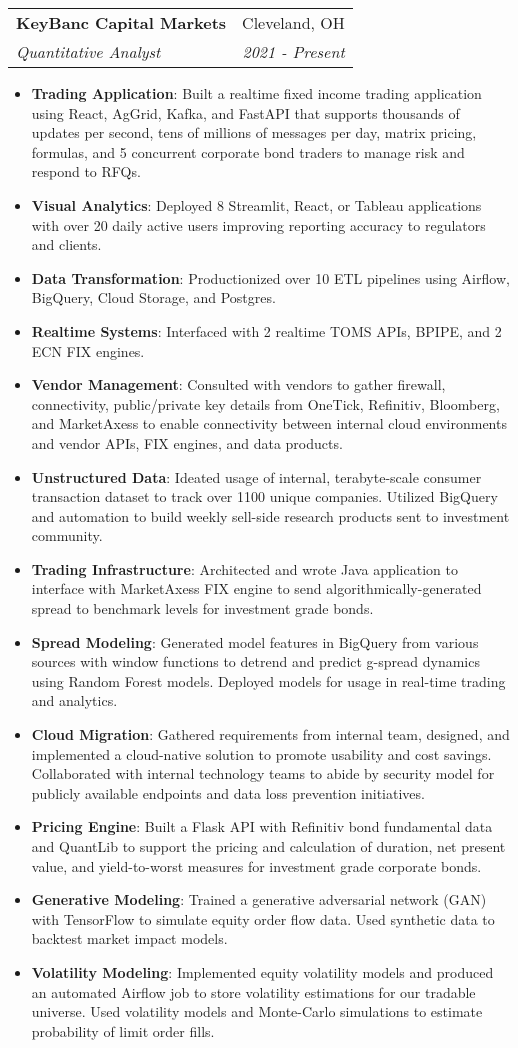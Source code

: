 \documentclass[letterpaper,11pt]{article}
\makeatletter
\newcommand{\resumeItem}[2]{
  \item\small{
    \textbf{#1}{: #2 \vspace{-2pt}}
  }
}
\newcommand{\resumeSubheading}[4]{
  \vspace{-1pt}\item
    \begin{tabular*}{0.97\textwidth}[t]{l@{\extracolsep{\fill}}r}
      \textbf{#1} & #2 \\
      \textit{\small#3} & \textit{\small #4} \\
    \end{tabular*}\vspace{-5pt}
}
\newcommand{\resumeItemListStart}{\begin{itemize}}
\newcommand{\resumeItemListEnd}{\end{itemize}\vspace{-5pt}}
\makeatother
\begin{document}
    \resumeSubheading
      {KeyBanc Capital Markets}{Cleveland, OH}
      {Quantitative Analyst}{2021 - Present}
      \resumeItemListStart
        \resumeItem{Trading Application}
            {Built a realtime fixed income trading application using React, AgGrid, Kafka, and FastAPI that supports thousands of updates per second, tens of millions of messages per day, matrix pricing, formulas, and 5 concurrent corporate bond traders to manage risk and respond to RFQs.}
        \resumeItem{Visual Analytics}
            {Deployed 8 Streamlit, React, or Tableau applications with over 20 daily active users improving reporting accuracy to regulators and clients.}
        \resumeItem{Data Transformation}
            {Productionized over 10 ETL pipelines using Airflow, BigQuery, Cloud Storage, and Postgres.}
        \resumeItem{Realtime Systems}
          {Interfaced with 2 realtime TOMS APIs, BPIPE, and 2 ECN FIX engines.}
        \resumeItem{Vendor Management}
          {Consulted with vendors to gather firewall, connectivity, public/private key details from OneTick, Refinitiv, Bloomberg, and MarketAxess to enable connectivity between internal cloud environments and vendor APIs, FIX engines, and data products.}
        \resumeItem{Unstructured Data}
          {Ideated usage of internal, terabyte-scale consumer transaction dataset to track over 1100 unique companies. Utilized BigQuery and automation to build weekly sell-side research products sent to investment community.}
        \resumeItem{Trading Infrastructure}
          {Architected and wrote Java application to interface with MarketAxess FIX engine to send algorithmically-generated spread to benchmark levels for investment grade bonds.}
        \resumeItem{Spread Modeling}
            {Generated model features in BigQuery from various sources with window functions to detrend and predict g-spread dynamics using Random Forest models. Deployed models for usage in real-time trading and analytics.}
        \resumeItem{Cloud Migration}
            {Gathered requirements from internal team, designed, and implemented a cloud-native solution to promote usability and cost savings. Collaborated with internal technology teams to abide by security model for publicly available endpoints and data loss prevention initiatives.}
        \resumeItem{Pricing Engine}
            {Built a Flask API with Refinitiv bond fundamental data and QuantLib to support the pricing and calculation of duration, net present value, and yield-to-worst measures for investment grade corporate bonds.}
        \resumeItem{Generative Modeling}
            {Trained a generative adversarial network (GAN) with TensorFlow to simulate equity order flow data. Used synthetic data to backtest market impact models.}
        \resumeItem{Volatility Modeling}
            {Implemented equity volatility models and produced an automated Airflow job to store volatility estimations for our tradable universe. Used volatility models and Monte-Carlo simulations to estimate probability of limit order fills.}
      \resumeItemListEnd
\end{document}
